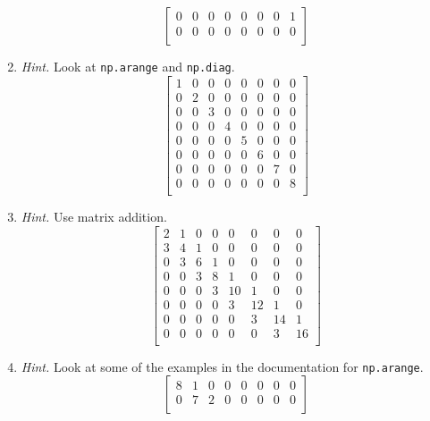 \documentclass{article}
\theoremstyle{remark}
\begin{document}
\begin{enumerate}
\begin{displaymath}
\begin{bmatrix}
      0 & 0 & 0 & 0 & 0 & 0 & 0 & 1 \\
      0 & 0 & 0 & 0 & 0 & 0 & 0 & 0 \\
    \end{bmatrix}
  \end{displaymath}
\item \textit{Hint.} Look at \texttt{np.arange} and \texttt{np.diag}.
  \begin{displaymath}
    \begin{bmatrix}
      1 & 0 & 0 & 0 & 0 & 0 & 0 & 0 \\
      0 & 2 & 0 & 0 & 0 & 0 & 0 & 0 \\
      0 & 0 & 3 & 0 & 0 & 0 & 0 & 0 \\
      0 & 0 & 0 & 4 & 0 & 0 & 0 & 0 \\
      0 & 0 & 0 & 0 & 5 & 0 & 0 & 0 \\
      0 & 0 & 0 & 0 & 0 & 6 & 0 & 0 \\
      0 & 0 & 0 & 0 & 0 & 0 & 7 & 0 \\
      0 & 0 & 0 & 0 & 0 & 0 & 0 & 8 \\
    \end{bmatrix}
  \end{displaymath}
\item \textit{Hint.} Use matrix addition.
  \begin{displaymath}
    \begin{bmatrix}
      2 & 1 & 0 & 0 & 0 & 0 & 0 & 0 \\
      3 & 4 & 1 & 0 & 0 & 0 & 0 & 0 \\
      0 & 3 & 6 & 1 & 0 & 0 & 0 & 0 \\
      0 & 0 & 3 & 8 & 1 & 0 & 0 & 0 \\
      0 & 0 & 0 & 3 & 10 & 1 & 0 & 0 \\
      0 & 0 & 0 & 0 & 3 & 12 & 1 & 0 \\
      0 & 0 & 0 & 0 & 0 & 3 & 14 & 1 \\
      0 & 0 & 0 & 0 & 0 & 0 & 3 & 16 \\
    \end{bmatrix}
  \end{displaymath}
\item \textit{Hint.} Look at some of the examples in the documentation for \texttt{np.arange}.
  \begin{displaymath}
    \begin{bmatrix}
      8 & 1 & 0 & 0 & 0 & 0 & 0 & 0 \\
      0 & 7 & 2 & 0 & 0 & 0 & 0 & 0 \\

\end{bmatrix}
\end{displaymath}
\end{enumerate}
\end{document}
